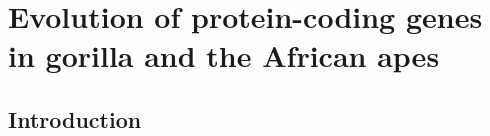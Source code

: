 \chapter{Evolution of protein-coding genes in gorilla and the African apes}
\label{ch_gorilla}
\acresetall

\section{Introduction}



